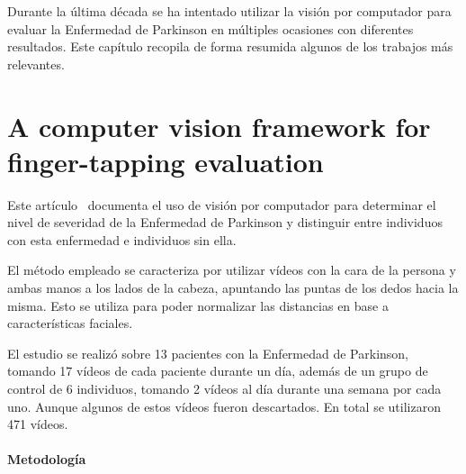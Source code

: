 \label{cha:Trabajos relacionados}

Durante la última década se ha intentado utilizar la visión por computador para
evaluar la Enfermedad de Parkinson en múltiples ocasiones con diferentes
resultados. Este capítulo recopila de forma resumida algunos de los trabajos más
relevantes.


\section{A computer vision framework for finger-tapping evaluation}

Este artículo~\cite{khan2014computer} documenta el uso de visión por computador
para determinar el nivel de severidad de la Enfermedad de Parkinson y distinguir
entre individuos con esta enfermedad e individuos sin ella.

El método empleado se caracteriza por utilizar vídeos con la cara de la persona
y ambas manos a los lados de la cabeza, apuntando las puntas de los dedos hacia
la misma. Esto se utiliza para poder normalizar las distancias en base a
características faciales.

El estudio se realizó sobre 13 pacientes con la Enfermedad de Parkinson, tomando
17 vídeos de cada paciente durante un día, además de un grupo de control de 6
individuos, tomando 2 vídeos al día durante una semana por cada uno. Aunque
algunos de estos vídeos fueron descartados. En total se utilizaron 471 vídeos.


\paragraph{Metodología}

